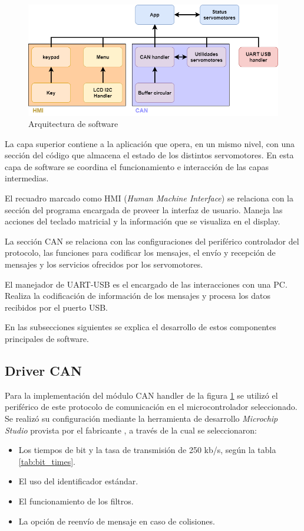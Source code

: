 \begin{figure}[htbp]
	\centering
	\includegraphics[scale=.5]{./Figures/arquitectura_software.png}
	\caption{Arquitectura de software}
	\label{fig:arq_software}
\end{figure}

La capa superior contiene a la aplicación que opera, en un mismo nivel, con una sección del código que almacena el estado de los distintos servomotores. En esta capa de software se coordina el funcionamiento e interacción de las capas intermedias.

El recuadro marcado como HMI (\textit{Human Machine Interface}) se relaciona con la sección del programa encargada de proveer la interfaz de usuario. Maneja las acciones del teclado matricial y la información que se visualiza en el display.

La sección CAN se relaciona con las configuraciones del periférico controlador del protocolo, las funciones para codificar los mensajes, el envío y recepción de mensajes y los servicios ofrecidos por los servomotores.

El manejador de UART-USB es el encargado de las interacciones con una PC. Realiza la codificación de información de los mensajes y procesa los datos recibidos por el puerto USB. 

En las subsecciones siguientes se explica el desarrollo de estos componentes principales de software.

\subsection{Driver CAN}

Para la implementación del módulo CAN handler de la figura \ref{fig:arq_software} se utilizó el periférico de este protocolo de comunicación en el microcontrolador seleccionado. Se realizó su configuración mediante la herramienta de desarrollo \textit{Microchip Studio} provista por el fabricante \citep{web_microchip_studio}, a través de la cual se seleccionaron:
\begin{itemize}
	\item Los tiempos de bit y la tasa de transmisión de 250 kb/s, según la tabla \ref{tab:bit_times}.
	\item El uso del identificador estándar.
	\item El funcionamiento de los filtros.
	\item La opción de reenvío de mensaje en caso de colisiones.
\end{itemize}

